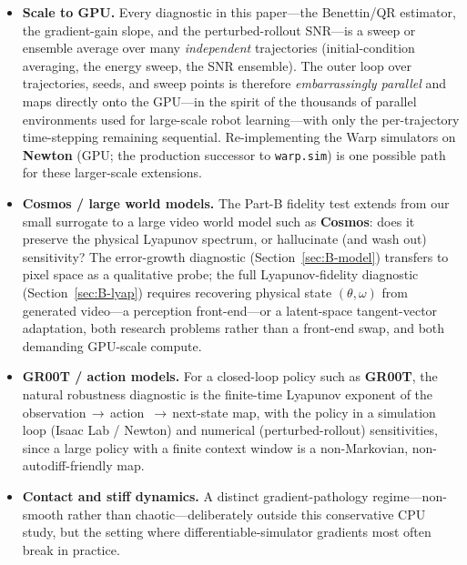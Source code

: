 \documentclass[11pt]{article}
\begin{document}
\begin{itemize}
\item \textbf{Scale to GPU.} Every diagnostic in this paper---the Benettin/QR estimator, the
gradient-gain slope, and the perturbed-rollout SNR---is a sweep or ensemble average over many
\emph{independent} trajectories (initial-condition averaging, the energy sweep, the SNR ensemble).
The outer loop over trajectories, seeds, and sweep points is therefore \emph{embarrassingly
parallel} and maps directly onto the GPU---in the spirit of the thousands of parallel environments
used for large-scale robot learning---with only the per-trajectory time-stepping remaining
sequential. Re-implementing the Warp simulators on \textbf{Newton} (GPU; the production successor
to \texttt{warp.sim}) is one possible path for these larger-scale extensions.

\item \textbf{Cosmos / large world models.} The Part-B fidelity test extends from our small
surrogate to a large video world model such as \textbf{Cosmos}: does it preserve the physical
Lyapunov spectrum, or hallucinate (and wash out) sensitivity? The error-growth diagnostic
(Section~\ref{sec:B-model}) transfers to pixel space as a qualitative probe; the full
Lyapunov-fidelity diagnostic (Section~\ref{sec:B-lyap}) requires recovering physical state
$(\theta,\omega)$ from generated video---a perception front-end---or a latent-space tangent-vector
adaptation, both research problems rather than a front-end swap, and both demanding GPU-scale
compute.

\item \textbf{GR00T / action models.} For a closed-loop policy such as \textbf{GR00T}, the natural
robustness diagnostic is the finite-time Lyapunov exponent of the observation\,$\to$\,action%
\,$\to$\,next-state map, with the policy in a simulation loop (Isaac Lab / Newton) and numerical
(perturbed-rollout) sensitivities, since a large policy with a finite context window is a
non-Markovian, non-autodiff-friendly map.

\item \textbf{Contact and stiff dynamics.} A distinct gradient-pathology regime---non-smooth rather
than chaotic---deliberately outside this conservative CPU study, but the setting where
differentiable-simulator gradients most often break in practice.
\end{itemize}
\end{document}
